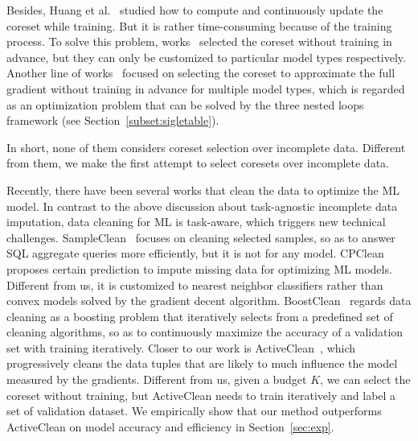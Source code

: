 %
Besides, Huang et al.~\cite{DBLP:conf/icml/HuangHLFD21} studied how to compute and continuously update the coreset while training. %
But it is rather time-consuming because of the training process. 
 To solve this problem, works~\cite{DBLP:conf/icml/CampbellB18, DBLP:journals/corr/BravermanFL16}   selected the coreset without training in advance, but they can only be customized to particular model types respectively. %
 Another line of works~\cite{DBLP:conf/icml/MirzasoleimanBL20, DBLP:conf/nips/MirzasoleimanCL20, DBLP:conf/emnlp/KirchhoffB14} focused on selecting the coreset to approximate the full gradient without training in advance for multiple model types, which is regarded as an optimization problem that can be solved  by the three nested loops framework (see Section~\ref{subset:sigletable}).

In short, none of them considers coreset selection over incomplete data. Different from them, we make the first attempt to select coresets over incomplete data.

 Recently, there have  been several works that clean the data to optimize the ML model. 
In contrast to the above discussion about task-agnostic incomplete data imputation, data cleaning for ML is task-aware, which triggers new technical challenges.
SampleClean~\cite{DBLP:journals/debu/KrishnanWFGKM015} focuses on cleaning selected samples, so as to answer  SQL aggregate  queries  more efficiently, but it is not for any model.
%
 CPClean~\cite{DBLP:journals/pvldb/KarlasLWGC0020} proposes certain prediction to impute missing data for optimizing ML models. Different from us, it is customized to nearest neighbor classifiers rather than convex models solved by the gradient decent algorithm. 
  BoostClean~\cite{DBLP:journals/corr/abs-1711-01299} regards data cleaning as a boosting problem that iteratively
 selects from a predefined set of cleaning algorithms, so as to continuously maximize the accuracy of  a validation set with training iteratively. 
Closer to our work is ActiveClean~\cite{DBLP:journals/pvldb/KrishnanWWFG16}, which progressively cleans the data tuples that are likely to much influence the model   measured by the gradients. 
Different from us,  given a budget $K$, we can select the coreset without training, but ActiveClean needs to train iteratively  and label a set of   validation  dataset.  We empirically show that our method outperforms ActiveClean on model accuracy and efficiency in Section~\ref{sec:exp}.

